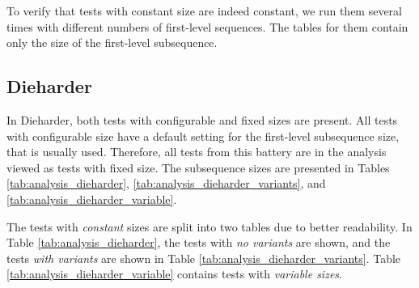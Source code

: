 \documentclass[
  digital,     %
  oneside,     %
  nosansbold,  %
  nocolorbold, %
  nolof,         %
  nolot,         %
]{fithesis4}
\begin{document}
To verify that tests with constant size are indeed constant, we run them several times with different numbers of first-level sequences. The tables for them contain only the size of the first-level subsequence.

\subsection{Dieharder}

In Dieharder, both tests with configurable and fixed sizes are present. All tests with configurable size have a default setting for the first-level subsequence size, that is usually used. Therefore, all tests from this battery are in the analysis viewed as tests with fixed size. The subsequence sizes are presented in Tables \ref{tab:analysis_dieharder}, \ref{tab:analysis_dieharder_variants}, and \ref{tab:analysis_dieharder_variable}.

 The tests with \emph{constant} sizes are split into two tables due to better readability. In Table \ref{tab:analysis_dieharder}, the tests with \emph{no variants} are shown, and the tests \emph{with variants} are shown in Table \ref{tab:analysis_dieharder_variants}. Table \ref{tab:analysis_dieharder_variable} contains tests with \emph{variable sizes}.
\end{document}
